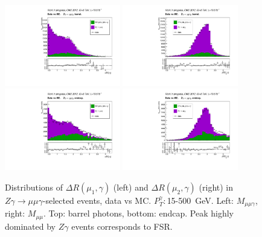 \begin{figure}[htb]
  \begin{center}
   \includegraphics[width=0.45\textwidth]{../figs/figs_v11/MUON_ZGamma/PrepareYields/c_TotalDATAvsMC_Barrel__lep1PhoDeltaRVERY_PRELIMINARY.pdf}   \includegraphics[width=0.45\textwidth]{../figs/figs_v11/MUON_ZGamma/PrepareYields/c_TotalDATAvsMC_Barrel__lep2PhoDeltaRVERY_PRELIMINARY.pdf}\\
\includegraphics[width=0.45\textwidth]{../figs/figs_v11/MUON_ZGamma/PrepareYields/c_TotalDATAvsMC_Endcap__lep1PhoDeltaRVERY_PRELIMINARY.pdf}   \includegraphics[width=0.45\textwidth]{../figs/figs_v11/MUON_ZGamma/PrepareYields/c_TotalDATAvsMC_Endcap__lep2PhoDeltaRVERY_PRELIMINARY.pdf}    \\
  \caption{Distributions of $\Delta R(\mu_1,\gamma)$ (left) and $\Delta R(\mu_2,\gamma)$ (right) in $Z\gamma\rightarrow\mu\mu\gamma$-selected events, data vs MC. $P_T^{\gamma}: $15-500~GeV. Left: $M_{\mu\mu\gamma}$, right: $M_{\mu\mu}$. Top: barrel photons, bottom: endcap. Peak highly dominated by $Z\gamma$ events corresponds to FSR.}
  \label{fig:Zg_ISRandFSR_dR}
  \end{center}
\end{figure}

